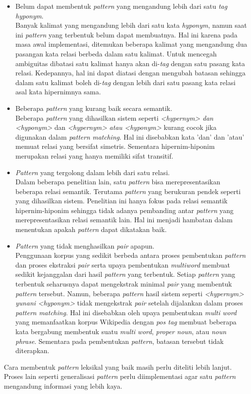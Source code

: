 \begin{itemize}
  \item Belum dapat membentuk \textit{pattern} yang mengandung lebih dari satu \textit{tag hyponym}. \\
  Banyak kalimat yang mengandung lebih dari satu kata \textit{hyponym}, namun saat ini \textit{pattern} yang terbentuk belum dapat membuatnya. Hal ini karena pada masa awal implementasi, ditemukan beberapa kalimat yang mengandung dua pasangan kata relasi berbeda dalam satu kalimat. Untuk mencegah ambiguitas dibatasi satu kalimat hanya akan di-\textit{tag} dengan satu pasang kata relasi. Kedepannya, hal ini dapat diatasi dengan mengubah batasan sehingga dalam satu kalimat boleh di-\textit{tag} dengan lebih dari satu pasang kata relasi asal kata hipernimnya sama. 
  \item Beberapa \textit{pattern} yang kurang baik secara semantik. \\
  Beberapa \textit{pattern} yang dihasilkan sistem seperti \textit{<hypernym> dan <hyponym>} dan  \textit{<hypernym> atau <hyponym>} kurang cocok jika digunakan dalam \textit{pattern matching}. Hal ini disebabkan kata 'dan' dan 'atau' memuat relasi yang bersifat simetris. Sementara hipernim-hiponim merupakan relasi yang hanya memiliki sifat transitif.
  \item \textit{Pattern} yang tergolong dalam lebih dari satu relasi. \\
  Dalam beberapa penelitian lain, satu \textit{pattern} bisa merepresentasikan beberapa relasi semantik. Terutama \textit{pattern} yang berukuran pendek seperti yang dihasilkan sistem. Penelitian ini hanya fokus pada relasi semantik hipernim-hiponim sehingga tidak adanya pembanding antar \textit{pattern} yang merepresentasikan relasi semantik lain. Hal ini menjadi hambatan dalam menentukan apakah \textit{pattern} dapat dikatakan baik.
  \item \textit{Pattern} yang tidak menghasilkan \textit{pair} apapun. \\
  Penggunaan korpus yang sedikit berbeda antara proses pembentukan \textit{pattern} dan proses ekstraksi \textit{pair} serta upaya pembentukan \textit{multiword} membuat sedikit kejanggalan dari hasil \textit{pattern} yang terbentuk. Setiap \textit{pattern} yang terbentuk seharusnya dapat mengekstrak minimal \textit{pair} yang membentuk \textit{pattern} tersebut. Namun, beberapa \textit{pattern} hasil sistem seperti \textit{<hypernym> yunani <hyponym>} tidak mengekstrak \textit{pair} setelah dijalankan dalam proses \textit{pattern matching}. Hal ini disebabkan oleh upaya pembentukan \textit{multi word} yang memanfaatkan korpus Wikipedia dengan \textit{pos tag} membuat beberapa kata bergabung membentuk suatu \textit{multi word}, \textit{proper noun}, atau \textit{noun phrase}. Sementara pada pembentukan \textit{pattern}, batasan tersebut tidak diterapkan.
\end{itemize}

Cara membentuk \textit{pattern} leksikal yang baik masih perlu diteliti lebih lanjut. Proses lain seperti generalisasi \textit{pattern} perlu diimplementasi agar satu \textit{pattern} mengandung informasi yang lebih kaya.
